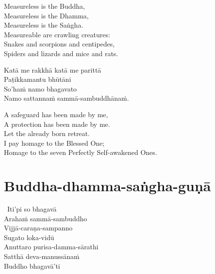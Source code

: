 \begin{english-verses}
  Measureless is the Buddha,\\
  Measureless is the Dhamma,\\
  Measureless is the Saṅgha.\\
  Measureable are crawling creatures:\\
  Snakes and scorpions and centipedes,\\
  Spiders and lizards and mice and rats.
\end{english-verses}

\begin{pali-hang-continued}
  Katā me rakkhā katā me parittā\\
  Paṭikkamantu bhūtāni\\
  So'haṁ namo bhagavato\\
  Namo sattannaṁ sammā-sambuddhānaṁ.
\end{pali-hang-continued}

\begin{english-verses}
  A safeguard has been made by me,\\
  A protection has been made by me.\\
  Let the already born retreat.\\
  I pay homage to the Blessed One;\\
  Homage to the seven Perfectly Self-awakened Ones.
\end{english-verses}

\suttaRef{[AN 4.67]}



\section{Buddha-dhamma-saṅgha-guṇā}
\label{buddha-dhamma-sangha-guna}

\begin{pali-hang}
  \anglebracketleft\ \hspace{-0.5mm}Iti'pi so bhagavā \hspace{-0.5mm}\anglebracketright\ \\
  Arahaṁ sammā-sambuddho\\
  Vijjā-caraṇa-sampanno\\
  Sugato loka-vidū\\
  Anuttaro purisa-damma-sārathi\\
  Satthā deva-manussānaṁ\\
  Buddho bhagavā'ti
\end{pali-hang}

